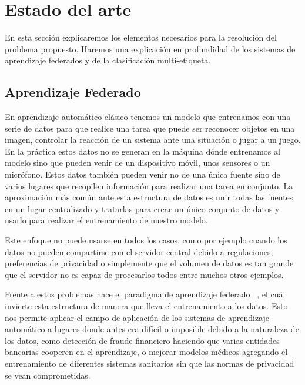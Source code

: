 \chapter{Estado del arte} \label{cap2}

\vspace*{5mm}

En esta sección explicaremos los elementos necesarios para la resolución del problema propuesto. Haremos una explicación en profundidad de los sistemas de aprendizaje federados y de la clasificación multi-etiqueta.

\section{Aprendizaje Federado}
En aprendizaje automático clásico tenemos un modelo que entrenamos con una serie de datos para que realice una tarea que puede ser reconocer objetos en una imagen, controlar la reacción de un sistema ante una situación o jugar a un juego. En la práctica estos datos no se generan en la máquina dónde entrenamos al modelo sino que pueden venir de un dispositivo móvil, unos sensores o un micrófono. Estos datos también pueden venir no de una única fuente sino de varios lugares que recopilen información para realizar una tarea en conjunto. La aproximación más común ante esta estructura de datos es unir todas las fuentes en un lugar centralizado y tratarlas para crear un único conjunto de datos y usarlo para realizar el entrenamiento de nuestro modelo.

Este enfoque no puede usarse en todos los casos, como por ejemplo cuando los datos no pueden compartirse con el servidor central debido a regulaciones, preferencias de privacidad o simplemente que el volumen de datos es tan grande que el servidor no es capaz de procesarlos todos entre muchos otros ejemplos.

Frente a estos problemas nace el paradigma de aprendizaje federado ~\cite{Yang_FL}, el cuál invierte esta estructura de manera que lleva el entrenamiento a los datos. Esto nos permite aplicar el campo de aplicación de los sistemas de aprendizaje automático a lugares donde antes era difícil o imposible debido a la naturaleza de los datos, como detección de fraude financiero haciendo que varias entidades bancarias cooperen en el aprendizaje, o mejorar modelos médicos agregando el entrenamiento de diferentes sistemas sanitarios sin que las normas de privacidad se vean comprometidas.

